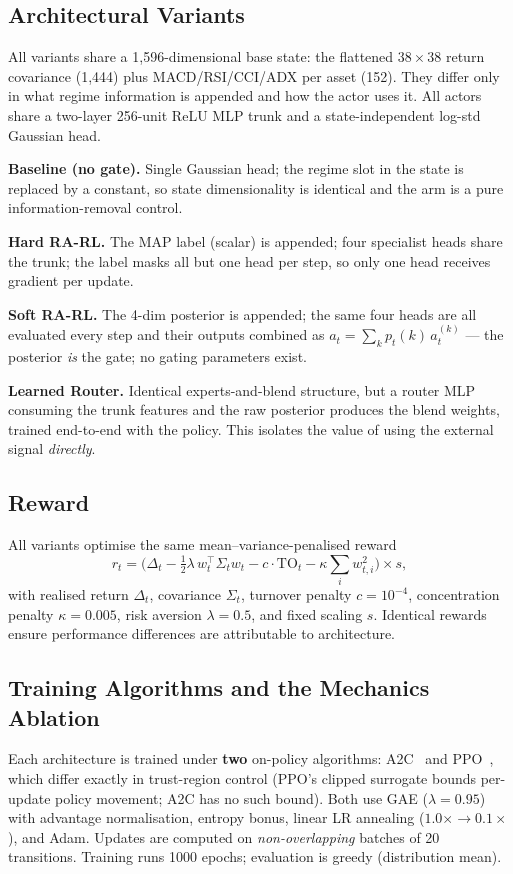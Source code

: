 \documentclass[sigconf,anonymous,review]{acmart}
\begin{document}
\subsection{Architectural Variants}
All variants share a 1{,}596-dimensional base state: the flattened
$38{\times}38$ return covariance (1{,}444) plus MACD/RSI/CCI/ADX per asset
(152). They differ only in what regime information is appended and how the
actor uses it. All actors share a two-layer 256-unit ReLU MLP trunk and a
state-independent log-std Gaussian head.

\textbf{Baseline (no gate).} Single Gaussian head; the regime slot in
the state is replaced by a constant, so state dimensionality is
identical and the arm is a pure information-removal control.

\textbf{Hard RA-RL.} The MAP label (scalar) is appended; four specialist
heads share the trunk; the label masks all but one head per step, so only
one head receives gradient per update.

\textbf{Soft RA-RL.} The 4-dim posterior is appended; the same four heads
are all evaluated every step and their outputs combined as
$a_t=\sum_k p_t(k)\, a_t^{(k)}$ --- the posterior \emph{is} the gate; no
gating parameters exist.

\textbf{Learned Router.} Identical experts-and-blend structure, but a
router MLP consuming the trunk features and the raw posterior produces the
blend weights, trained end-to-end with the policy. This isolates the value
of using the external signal \emph{directly}.

\subsection{Reward}
All variants optimise the same mean--variance-penalised reward
\[
r_t = \big(\Delta_t - \tfrac{1}{2}\lambda\, w_t^{\top}\Sigma_t w_t
      - c\cdot \mathrm{TO}_t - \kappa \textstyle\sum_i w_{t,i}^2\big)\times s,
\]
with realised return $\Delta_t$, covariance $\Sigma_t$, turnover penalty
$c{=}10^{-4}$, concentration penalty $\kappa{=}0.005$, risk aversion
$\lambda{=}0.5$, and fixed scaling $s$. Identical rewards ensure
performance differences are attributable to architecture.

\subsection{Training Algorithms and the Mechanics Ablation}
\label{sec:mechanics}
Each architecture is trained under \textbf{two} on-policy algorithms:
A2C~\cite{mnih2016a2c} and PPO~\cite{schulman2017ppo}, which differ
exactly in trust-region control (PPO's clipped surrogate bounds per-update
policy movement; A2C has no such bound). Both use GAE
($\lambda{=}0.95$)~\cite{schulman2016gae} with advantage normalisation,
entropy bonus, linear LR annealing ($1.0\times\rightarrow0.1\times$), and
Adam. Updates are computed on \emph{non-overlapping} batches of 20
transitions. Training runs 1000 epochs; evaluation is greedy (distribution
mean).
\end{document}

